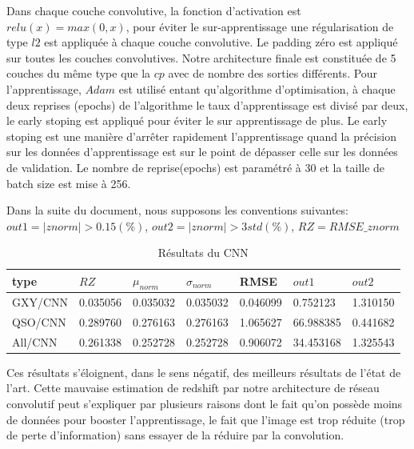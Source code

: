Dans chaque couche convolutive, la fonction d'activation est $relu(x) = max (0, x)$, pour éviter le sur-apprentissage une régularisation de type $l2$ est appliquée à chaque couche convolutive. Le padding zéro est appliqué sur toutes les couches convolutives. Notre architecture finale est constituée de 5 couches du même type que la $cp$ avec de nombre des sorties différents. Pour l'apprentissage, $Adam$ est utilisé entant qu'algorithme d'optimisation, à chaque deux reprises (epochs) de l'algorithme le taux d'apprentissage est divisé par deux, le early stoping est appliqué pour éviter le sur apprentissage de plus. Le early stoping est une manière d'arrêter rapidement l'apprentissage quand la précision sur les données d'apprentissage est sur le point de dépasser celle sur les données de validation. Le nombre de reprise(epochs) est paramétré à 30 et la taille de batch size est mise à 256.

Dans la suite du document, nous supposons les conventions suivantes:
$out1 = |znorm| > 0.15 (\%)$,  $out2 = |znorm| > 3std (\%)$, $RZ = RMSE\_znorm$ 
\begin{table}[H]
	\centering
	\begin{tabular}{|l|l|l|l|l|l|l|}
		\hline
		type & $RZ$ & $\mu_{norm}$ & $\sigma_{norm}$ & RMSE & $out1$ & $out2$ \\
		\hline
		GXY/CNN & 0.035056 & 0.035032 & 0.035032 & 0.046099 & 0.752123 & 1.310150 \\
		\hline
		QSO/CNN & 0.289760 & 0.276163 & 0.276163 &1.065627 & 66.988385 & 0.441682\\
		\hline
		All/CNN & 0.261338 & 0.252728 & 0.252728 & 0.906072& 34.453168 &1.325543 \\
		\hline
	\end{tabular}
	\caption{Résultats du CNN}
\end{table}

Ces résultats s'éloignent, dans le sens négatif, des meilleurs résultats de l'état de l'art. Cette mauvaise estimation de redshift par notre architecture de réseau convolutif peut s'expliquer par plusieurs raisons dont le fait qu'on possède moins de données pour booster l'apprentissage, le fait que l'image est trop réduite (trop de perte d'information) sans essayer de la réduire par la convolution.
 
